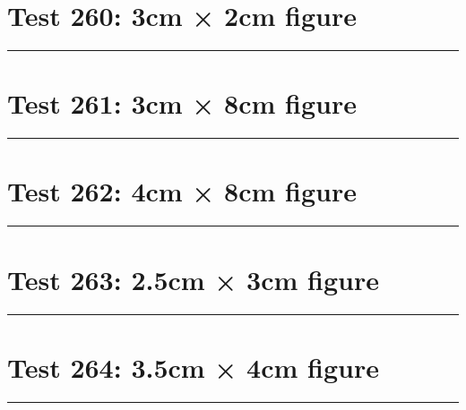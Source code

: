 \documentclass[a4paper,11pt]{article}
\begin{document}
\section*{Test 260: 3cm × 2cm figure}
\begin{swarmwrap}%
  \begin{minipage}[t]{3cm}
    \centering
    \rule{\linewidth}{2cm}
  \end{minipage}%
\end{swarmwrap}%
\swarmwrapnext
\lipsum[93]
\lipsum[94]
\lipsum[95]
\lipsum[96]
\lipsum[97]
\section*{Test 261: 3cm × 8cm figure}
\begin{swarmwrap}%
  \begin{minipage}[t]{3cm}
    \centering
    \rule{\linewidth}{8cm}
  \end{minipage}%
\end{swarmwrap}%
\swarmwrapnext
\lipsum[64]
\lipsum[65]
\lipsum[66]
\lipsum[67]
\section*{Test 262: 4cm × 8cm figure}
\begin{swarmwrap}%
  \begin{minipage}[t]{4cm}
    \centering
    \rule{\linewidth}{8cm}
  \end{minipage}%
\end{swarmwrap}%
\swarmwrapnext
\lipsum[45]
\lipsum[46]
\lipsum[47]
\lipsum[48]
\section*{Test 263: 2.5cm × 3cm figure}
\begin{swarmwrap}%
  \begin{minipage}[t]{2cm}
    \centering
    \rule{\linewidth}{3cm}
  \end{minipage}%
\end{swarmwrap}%
\swarmwrapnext
\lipsum[63]
\lipsum[64]
\lipsum[65]
\lipsum[66]
\lipsum[67]
\lipsum[68]
\section*{Test 264: 3.5cm × 4cm figure}
\begin{swarmwrap}%
  \begin{minipage}[t]{3cm}
    \centering
    \rule{\linewidth}{4cm}
  \end{minipage}%
\end{swarmwrap}%
\swarmwrapnext
\lipsum[120]
\lipsum[121]
\lipsum[122]
\lipsum[123]
\end{document}
